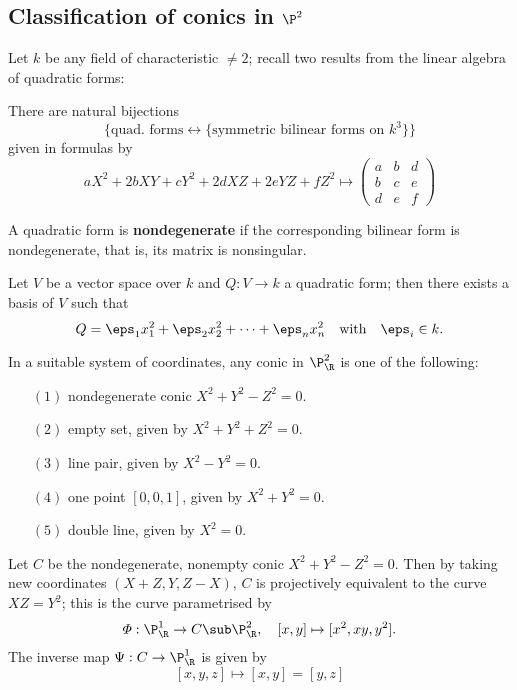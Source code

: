 \subsection{Classification of conics in $\P^2$}
Let $k$ be any field of characteristic $\neq 2$; recall two results from the linear algebra of quadratic forms:
\begin{proposition}
There are natural bijections
\[\{\text{quad. forms}\leftrightarrow \{\text{symmetric bilinear
forms on $k^3$}\}\}\]
given in formulas by
\[aX^2+2bXY+cY^2+2dXZ+2eYZ+fZ^2\mapsto\begin{pmatrix}
a&b&d\\
b&c&e\\
d&e&f
\end{pmatrix}\]
\end{proposition}
A quadratic form is \textbf{nondegenerate} if the corresponding bilinear form is nondegenerate, that is, its matrix is nonsingular.
\begin{theorem}
Let $V$ be a vector space over $k$ and $Q:V\to k$ a quadratic form; then there exists a basis of $V$ such that
\[Q=\eps_1x_1^2+\eps_2 x_2^2+\cdots+\eps_n x_n^2\quad\text{with}\quad \eps_i\in k.\]
\end{theorem}
\begin{theorem}
In a suitable system of coordinates, any conic in $\P^2_\R$ is one of the following:
\begin{itemize}
\item[$(1)$] nondegenerate conic $X^2+Y^2-Z^2=0$.
\item[$(2)$] empty set, given by $X^2+Y^2+Z^2=0$.
\item[$(3)$] line pair, given by $X^2-Y^2=0$.
\item[$(4)$] one point $[0,0,1]$, given by $X^2+Y^2=0$.
\item[$(5)$] double line, given by $X^2=0$.
\end{itemize}
\end{theorem}
Let $C$ be the nondegenerate, nonempty conic $X^2+Y^2-Z^2=0$. Then by taking new coordinates $(X+Z,Y,Z-X)$, $C$ is projectively equivalent to the curve $XZ=Y^2$; this is the curve parametrised by
\[\varPhi:\P^1_\R\to C\sub\P^2_\R,\quad [x,y]\mapsto[x^2,xy,y^2].\]
The inverse map $\Psi:C\to\P^1_\R$ is given by
\[[x,y,z]\mapsto[x,y]=[y,z]\]
